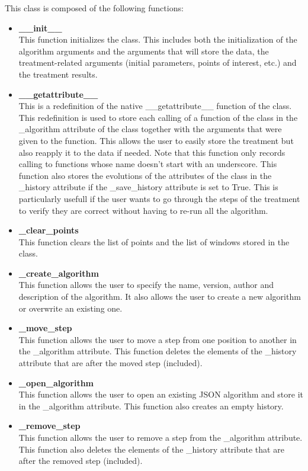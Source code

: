 This class is composed of the following functions:
\begin{itemize}
    \item \textbf{\_\_init\_\_} \\ This function initializes the class. This includes both the initialization of the algorithm arguments and the arguments that will store the data, the treatment-related arguments (initial parameters, points of interest, etc.) and the treatment results. 
    \item \textbf{\_\_getattribute\_\_} \\ This is a redefinition of the native \_\_getattribute\_\_ function of the class. This redefinition is used to store each calling of a function of the class in the \_algorithm attribute of the class together with the arguments that were given to the function. This allows the user to easily store the treatment but also reapply it to the data if needed. Note that this function only records calling to functions whose name doesn't start with an underscore. This function also stores the evolutions of the attributes of the class in the \_history attribute if the \_save\_history attribute is set to True. This is particularly usefull if the user wants to go through the steps of the treatment to verify they are correct without having to re-run all the algorithm.
    \item \textbf{\_clear\_points} \\ This function clears the list of points and the list of windows stored in the class.
    \item \textbf{\_create\_algorithm} \\ This function allows the user to specify the name, version, author and description of the algorithm. It also allows the user to create a new algorithm or overwrite an existing one.
    \item \textbf{\_move\_step} \\ This function allows the user to move a step from one position to another in the \_algorithm attribute. This function deletes the elements of the \_history attribute that are after the moved step (included).
    \item \textbf{\_open\_algorithm} \\ This function allows the user to open an existing JSON algorithm and store it in the \_algorithm attribute. This function also creates an empty history.
    \item \textbf{\_remove\_step} \\ This function allows the user to remove a step from the \_algorithm attribute. This function also deletes the elements of the \_history attribute that are after the removed step (included).

\end{itemize}
